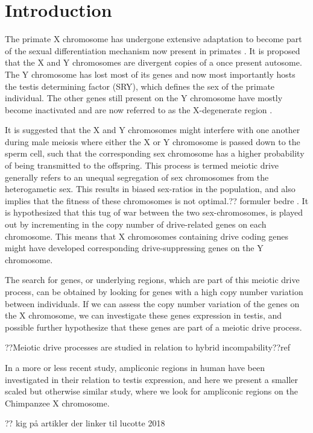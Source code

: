 \section*{Introduction}






The primate X chromosome has undergone extensive adaptation to become part of the sexual differentiation mechanism now present in primates \cite{skaletsklyMSY}.  It is proposed that the X and Y chromosomes are divergent copies of a once present autosome. The Y chromosome has lost most of its genes and now most importantly hosts the testis determining factor (SRY), which defines the sex of the primate individual. The other genes still present on the Y chromosome have mostly become inactivated and are now referred to as the X-degenerate region \cite{skaletsklyMSY}.


It is suggested that the X and Y chromosomes might interfere with one another during male meiosis where either the X or Y chromosome is passed down to the sperm cell, such that the corresponding sex chromosome has a higher probability of being transmitted to the offspring. This process is termed meiotic drive generally refers to an unequal segregation of sex chromosomes from the heterogametic sex. This results in biased sex-ratios in the population, and also implies that the fitness of these chromosomes is not optimal.?? formuler bedre \cite{doi:jaenike_10.1146/annurev.ecolsys.32.081501.113958}. It is hypothesized that this tug of war between the two sex-chromosomes, is played out by incrementing in the copy number of drive-related genes on each chromosome. This means that X chromosomes containing drive coding genes might have developed corresponding drive-suppressing genes on the Y chromosome. 

The search for genes, or underlying regions, which are part of this meiotic drive process, can be obtained by looking for genes with a high copy number variation between individuals. If we can assess the copy number variation of the genes on the X chromosome, we can investigate these genes expression in testis, and possible further hypothesize that these genes are part of a meiotic drive process.

??Meiotic drive processes are studied in relation to hybrid incompability??ref


In a more or less recent study\cite{Lucotte907}, ampliconic regions in human have been investigated in their relation to testis expression, and here we present a smaller scaled but otherwise similar study, where we look for ampliconic regions on the Chimpanzee X chromosome.



?? kig på artikler der linker til lucotte 2018


